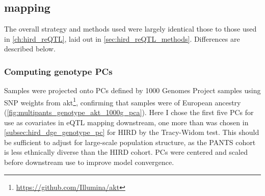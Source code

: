 \subsection{ mapping}

The overall strategy and methods used were largely identical those to those used in \cref{ch:hird_reQTL}, laid out in \cref{sec:hird_reQTL_methods}.
Differences are described below.

\subsubsection{Computing genotype PCs}

Samples were projected onto \glspl{PC} defined by 1000 Genomes Project samples using \gls{SNP} weights from {akt}\footnote{\url{https://github.com/Illumina/akt}},
confirming that samples were of European ancestry (\cref{fig:multipants_genotype_akt_1000g_pca}).
Here I chose the first five \glspl{PC} for use as covariates in \gls{eQTL} mapping downstream, one more than was chosen in \cref{subsec:hird_dge_genotype_pc} for \gls{HIRD} by the Tracy-Widom test.
This should be sufficient to adjust for large-scale population structure, as the \gls{PANTS} cohort is less ethnically diverse than the \gls{HIRD} cohort.
\glspl{PC} were centered and scaled before downstream use to improve model convergence.

